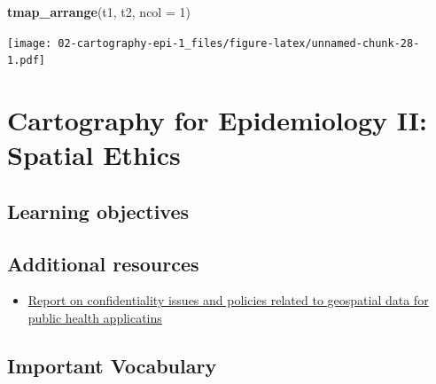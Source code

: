 \documentclass[
]{book}
\newenvironment{Shaded}{\begin{snugshade}}{\end{snugshade}}
\newcommand{\AttributeTok}[1]{\textcolor[rgb]{0.13,0.29,0.53}{#1}}
\newcommand{\DecValTok}[1]{\textcolor[rgb]{0.00,0.00,0.81}{#1}}
\newcommand{\FunctionTok}[1]{\textcolor[rgb]{0.13,0.29,0.53}{\textbf{#1}}}
\newcommand{\NormalTok}[1]{#1}
\providecommand{\tightlist}{%
  \setlength{\itemsep}{0pt}\setlength{\parskip}{0pt}}
\begin{document}
\begin{Shaded}
\begin{Highlighting}[]
\FunctionTok{tmap\_arrange}\NormalTok{(t1, t2, }\AttributeTok{ncol =} \DecValTok{1}\NormalTok{)}
\end{Highlighting}
\end{Shaded}

\texttt{[image: 02-cartography-epi-1\_files/figure-latex/unnamed-chunk-28-1.pdf]}

\hypertarget{cartography-for-epidemiology-ii-spatial-ethics}{%
\chapter{Cartography for Epidemiology II: Spatial Ethics}\label{cartography-for-epidemiology-ii-spatial-ethics}}

\hypertarget{learning-objectives-2}{%
\section{Learning objectives}\label{learning-objectives-2}}

\hypertarget{additional-resources-2}{%
\section{Additional resources}\label{additional-resources-2}}

\begin{itemize}
\tightlist
\item
  \href{http://www.ciesin.columbia.edu/pdf/SEDAC_ConfidentialityReport.pdf}{Report on confidentiality issues and policies related to geospatial data for public health applicatins}
\end{itemize}

\hypertarget{important-vocabulary-2}{%
\section{Important Vocabulary}\label{important-vocabulary-2}}

 
  \providecommand{\huxb}[2]{\arrayrulecolor[RGB]{#1}\global\arrayrulewidth=#2pt}
  \providecommand{\huxvb}[2]{\color[RGB]{#1}\vrule width #2pt}
  \providecommand{\huxtpad}[1]{\rule{0pt}{#1}}
  \providecommand{\huxbpad}[1]{\rule[-#1]{0pt}{#1}}
\end{document}
